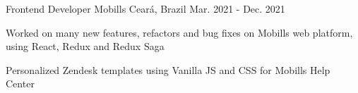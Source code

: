 \begin{cventries}
  \cventry
    {Frontend Developer} %
    {Mobills} %
    {Ceará, Brazil} %
    {Mar. 2021 - Dec. 2021} %
    {
      \begin{cvitems} %
        \item {Worked on many new features,
        refactors and bug fixes on Mobills
        web platform, using React, Redux
        and Redux Saga}
        \item {Personalized Zendesk templates
        using Vanilla JS and CSS for
        Mobills Help Center}
      \end{cvitems}
    }

\end{cventries}
